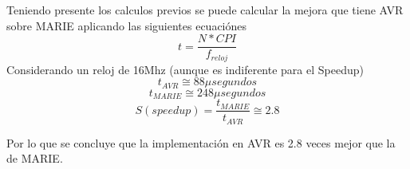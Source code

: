\documentclass[letterpaper, 10 pt, conference]{ieeeconf}  %
\begin{document}
Teniendo presente los calculos previos se puede calcular la mejora que tiene AVR sobre MARIE aplicando las siguientes ecuaciónes
\begin{equation*}
  t = \frac{N*CPI}{f_{reloj}}
\end{equation*}
Considerando un reloj de 16Mhz (aunque es indiferente para el Speedup)
\begin{equation*}
  t_{AVR} \cong 88\mu segundos
\end{equation*}
\begin{equation*}
  t_{MARIE} \cong 248\mu segundos
\end{equation*}
\begin{equation*}
  S (speedup) = \frac{t_{MARIE}}{t_{AVR}} \cong 2.8
\end{equation*}

Por lo que se concluye que la implementación en AVR es 2.8 veces mejor que la de MARIE.
\end{document}
